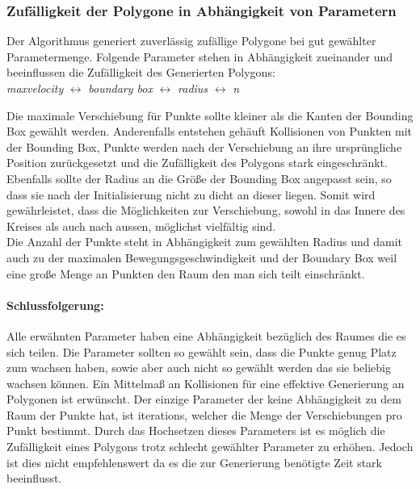   \subsubsection{Zufälligkeit der Polygone in Abhängigkeit von Parametern}
    Der Algorithmus generiert zuverlässig zufällige Polygone bei gut
    gewählter Parametermenge.
    Folgende Parameter stehen in Abhängigkeit zueinander und beeinflussen die 
    Zufälligkeit des Generierten Polygons:\\
    \emph{maxvelocity} $\leftrightarrow$ \emph{boundary box} $\leftrightarrow$ 
    \emph{radius} $\leftrightarrow$ \emph{n}

    Die maximale Verschiebung für Punkte sollte kleiner als die Kanten der 
    Bounding Box gewählt werden. Anderenfalls entstehen gehäuft Kollisionen 
    von Punkten mit der Bounding Box, Punkte werden nach der Verschiebung an 
    ihre ursprüngliche Position zurückgesetzt und die Zufälligkeit des Polygons 
    stark eingeschränkt.
    Ebenfalls sollte der Radius an die Größe der Bounding Box angepasst sein, so dass sie nach der Initialisierung nicht zu dicht an dieser liegen. Somit wird gewährleistet, dass die Möglichkeiten zur Verschiebung, sowohl in das Innere des Kreises als auch nach aussen, möglichst vielfältig sind.\\
    Die Anzahl der Punkte steht in Abhängigkeit zum gewählten Radius und damit 
    auch zu der maximalen Bewegungsgeschwindigkeit und der Boundary Box 
    weil eine große Menge an Punkten den Raum den man sich teilt 
    einschränkt.
    \paragraph{Schlussfolgerung:}
    Alle erwähnten Parameter haben eine Abhängigkeit bezüglich des Raumes 
    die es sich teilen. Die Parameter sollten so gewählt sein, dass die 
    Punkte genug Platz zum wachsen haben, sowie aber auch nicht so gewählt 
    werden das sie beliebig wachsen können. Ein Mittelmaß an Kollisionen 
    für eine effektive Generierung an Polygonen ist erwünscht.
    Der einzige Parameter der keine Abhängigkeit zu dem Raum der Punkte hat, 
    ist iterations, welcher die Menge der Verschiebungen pro Punkt bestimmt.
    Durch das Hochsetzen dieses Parameters ist 
    es möglich die Zufälligkeit eines Polygons trotz schlecht gewählter 
    Parameter zu erhöhen. 
    Jedoch ist dies nicht empfehlenswert da es die 
    zur Generierung benötigte Zeit stark beeinflusst.  

  
